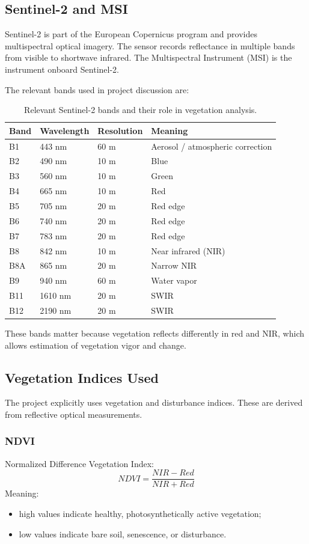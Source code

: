 \documentclass[11pt]{article}
\begin{document}
\subsection{Sentinel-2 and MSI}
Sentinel-2 is part of the European Copernicus program and provides multispectral optical imagery. The sensor records reflectance in multiple bands from visible to shortwave infrared. The Multispectral Instrument (MSI) is the instrument onboard Sentinel-2.

The relevant bands used in project discussion are:
\begin{table}[H]
\centering
\renewcommand{\arraystretch}{1.2}
\begin{tabular}{p{1cm} p{1.7cm} p{2.4cm} p{5.6cm}}
\toprule
\textbf{Band} & \textbf{Wavelength} & \textbf{Resolution} & \textbf{Meaning} \\
\midrule
B1 & 443 nm & 60 m & Aerosol / atmospheric correction \\
B2 & 490 nm & 10 m & Blue \\
B3 & 560 nm & 10 m & Green \\
B4 & 665 nm & 10 m & Red \\
B5 & 705 nm & 20 m & Red edge \\
B6 & 740 nm & 20 m & Red edge \\
B7 & 783 nm & 20 m & Red edge \\
B8 & 842 nm & 10 m & Near infrared (NIR) \\
B8A & 865 nm & 20 m & Narrow NIR \\
B9 & 940 nm & 60 m & Water vapor \\
B11 & 1610 nm & 20 m & SWIR \\
B12 & 2190 nm & 20 m & SWIR \\
\bottomrule
\end{tabular}
\caption{Relevant Sentinel-2 bands and their role in vegetation analysis.}
\end{table}

These bands matter because vegetation reflects differently in red and NIR, which allows estimation of vegetation vigor and change.

\subsection{Vegetation Indices Used}
The project explicitly uses vegetation and disturbance indices. These are derived from reflective optical measurements.

\subsubsection{NDVI}
Normalized Difference Vegetation Index:
\[
NDVI = \frac{NIR - Red}{NIR + Red}
\]
Meaning:
\begin{itemize}
    \item high values indicate healthy, photosynthetically active vegetation;
    \item low values indicate bare soil, senescence, or disturbance.
\end{itemize}
\end{document}
